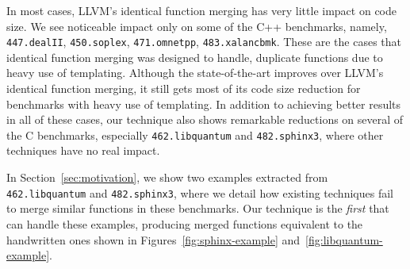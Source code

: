 In most cases, LLVM's identical function merging has very little impact on code
size.
We see noticeable impact only on some of the C++ benchmarks, namely,
\texttt{447.dealII}, \texttt{450.soplex}, \texttt{471.omnetpp}, \texttt{483.xalancbmk}.
These are the cases that identical function merging was designed to handle,
duplicate functions due to heavy use of templating.
Although the state-of-the-art improves over LLVM's identical function merging,
it still gets most of its code size reduction for benchmarks with heavy use of templating.
In addition to achieving better results in all of these cases, our technique
also shows remarkable reductions on several of the
C benchmarks, especially \texttt{462.libquantum} and \texttt{482.sphinx3}, where
other techniques have no real impact.


In Section~\ref{sec:motivation}, we show two examples extracted from
\texttt{462.libquantum} and \texttt{482.sphinx3}, where we detail how existing
techniques fail to merge similar functions in these benchmarks.
Our technique is the \textit{first} that can handle these examples, producing
merged functions equivalent to the handwritten ones shown in
Figures~\ref{fig:sphinx-example} and~\ref{fig:libquantum-example}.


